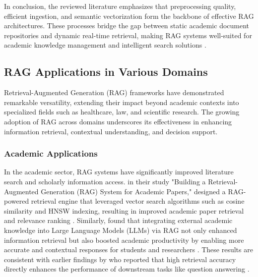 \begin{refsection}
\hspace{0.4cm}In conclusion, the reviewed literature emphasizes that preprocessing quality, efficient ingestion, and semantic vectorization form the backbone of effective RAG architectures. These processes bridge the gap between static academic document repositories and dynamic real-time retrieval, making RAG systems well-suited for academic knowledge management and intelligent search solutions \cite{allu2024beyond, aquino2024extracting}.


\subsection{RAG Applications in Various Domains}

\hspace{1cm}Retrieval-Augmented Generation (RAG) frameworks have demonstrated remarkable versatility, extending their impact beyond academic contexts into specialized fields such as healthcare, law, and scientific research. The growing adoption of RAG across domains underscores its effectiveness in enhancing information retrieval, contextual understanding, and decision support.

\subsubsection{Academic Applications}
\hspace{0.4cm}In the academic sector, RAG systems have significantly improved literature search and scholarly information access.\citeauthor{grigoryan2024building} \citeyear{grigoryan2024building} in their study "Building a Retrieval-Augmented Generation (RAG) System for Academic Papers," designed a RAG-powered retrieval engine that leveraged vector search algorithms such as cosine similarity and HNSW indexing, resulting in improved academic paper retrieval and relevance ranking \citeauthor{grigoryan2024building}. Similarly, \citeyear{song2024travelrag} \cite{song2024travelrag} found that integrating external academic knowledge into Large Language Models (LLMs) via RAG not only enhanced information retrieval but also boosted academic productivity by enabling more accurate and contextual responses for students and researchers \cite{song2024travelrag}. These results are consistent with earlier findings by \citeauthor{karpukhin2020dense} \citeyear{karpukhin2020dense} who reported that high retrieval accuracy directly enhances the performance of downstream tasks like question answering \cite{karpukhin2020dense}.



\end{refsection}

